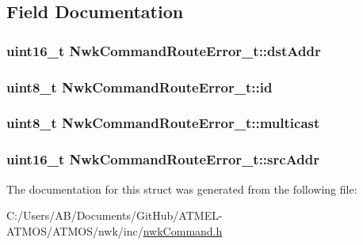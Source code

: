 \subsection{Field Documentation}
\hypertarget{struct_nwk_command_route_error__t_aaa294eee1e346a66b8f85b8578d0504b}{
\subsubsection[{dst\-Addr}]{\setlength{\rightskip}{0pt plus 5cm}uint16\-\_\-t Nwk\-Command\-Route\-Error\-\_\-t\-::dst\-Addr}}\label{struct_nwk_command_route_error__t_aaa294eee1e346a66b8f85b8578d0504b}
\hypertarget{struct_nwk_command_route_error__t_afe68500e423cbc2f17ebb51a19303fc8}{
\subsubsection[{id}]{\setlength{\rightskip}{0pt plus 5cm}uint8\-\_\-t Nwk\-Command\-Route\-Error\-\_\-t\-::id}}\label{struct_nwk_command_route_error__t_afe68500e423cbc2f17ebb51a19303fc8}
\hypertarget{struct_nwk_command_route_error__t_a709e4570410b7104c0acec52189d7302}{
\subsubsection[{multicast}]{\setlength{\rightskip}{0pt plus 5cm}uint8\-\_\-t Nwk\-Command\-Route\-Error\-\_\-t\-::multicast}}\label{struct_nwk_command_route_error__t_a709e4570410b7104c0acec52189d7302}
\hypertarget{struct_nwk_command_route_error__t_a806f760a691cc29aa54ad72a048a97f3}{
\subsubsection[{src\-Addr}]{\setlength{\rightskip}{0pt plus 5cm}uint16\-\_\-t Nwk\-Command\-Route\-Error\-\_\-t\-::src\-Addr}}\label{struct_nwk_command_route_error__t_a806f760a691cc29aa54ad72a048a97f3}


The documentation for this struct was generated from the following file\-:\begin{DoxyCompactItemize}
\item 
C\-:/\-Users/\-A\-B/\-Documents/\-Git\-Hub/\-A\-T\-M\-E\-L-\/\-A\-T\-M\-O\-S/\-A\-T\-M\-O\-S/nwk/inc/\hyperlink{nwk_command_8h}{nwk\-Command.\-h}\end{DoxyCompactItemize}
